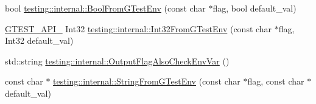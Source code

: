 \begin{DoxyCompactItemize}
\item 
bool \mbox{\hyperlink{namespacetesting_1_1internal_a67132cdce23fb71b6c38ee34ef81eb4c}{testing\+::internal\+::\+Bool\+From\+G\+Test\+Env}} (const char $\ast$flag, bool default\+\_\+val)
\item 
\mbox{\hyperlink{_obj__test_2lib_2googletest-release-1_88_81_2googletest_2include_2gtest_2internal_2gtest-port_8h_aa73be6f0ba4a7456180a94904ce17790}{G\+T\+E\+S\+T\+\_\+\+A\+P\+I\+\_\+}} Int32 \mbox{\hyperlink{namespacetesting_1_1internal_a0f7e728793f9e6cb0aa2b69eaa468bf3}{testing\+::internal\+::\+Int32\+From\+G\+Test\+Env}} (const char $\ast$flag, Int32 default\+\_\+val)
\item 
std\+::string \mbox{\hyperlink{namespacetesting_1_1internal_a0c793c6d84760d900299916c077a1af4}{testing\+::internal\+::\+Output\+Flag\+Also\+Check\+Env\+Var}} ()
\item 
const char $\ast$ \mbox{\hyperlink{namespacetesting_1_1internal_a7ed785df46a339403b0f749d3a879201}{testing\+::internal\+::\+String\+From\+G\+Test\+Env}} (const char $\ast$flag, const char $\ast$default\+\_\+val)
\end{DoxyCompactItemize}
